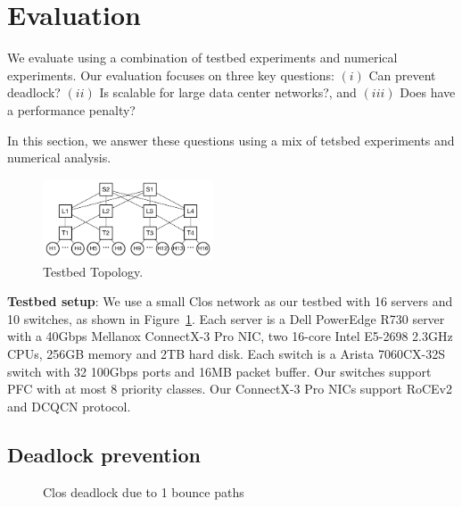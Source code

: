 \section{Evaluation}\label{sec:eval}

We evaluate \sysname{} using a combination of testbed experiments and numerical
experiments. Our evaluation focuses on three key questions: $(i)$ Can \sysname{}
prevent deadlock? $(ii)$ Is \sysname{} scalable for large data center networks?,
and $(iii)$ Does \sysname{} have a performance penalty?

In this section, we answer these questions using a mix of tetsbed experiments
and numerical analysis.

\begin{figure}
	\centering
	\includegraphics[width=0.45\textwidth] {figs/testbed_topo}
	\caption{Testbed Topology.}\label{fig:testbed_topo}
\end{figure}

\textbf{Testbed setup}: We use a small Clos network as our testbed with 16
servers and 10 switches, as shown in Figure~\ref{fig:testbed_topo}. Each server
is a Dell PowerEdge R730 server with a 40Gbps Mellanox ConnectX-3 Pro NIC, two
16-core Intel E5-2698 2.3GHz CPUs, 256GB memory and 2TB hard disk. Each switch
is a Arista 7060CX-32S switch with 32 100Gbps ports and 16MB packet buffer. Our
switches support PFC with at most 8 priority classes. Our ConnectX-3 Pro NICs
support RoCEv2 and DCQCN protocol.

\subsection{Deadlock prevention}\label{subsec:exp_validation}

\begin{figure}[t]
	\centering
	
	
	\caption{Clos deadlock due to 1 bounce paths}\label{fig:exp_validation_nonloop}
	
\end{figure}

